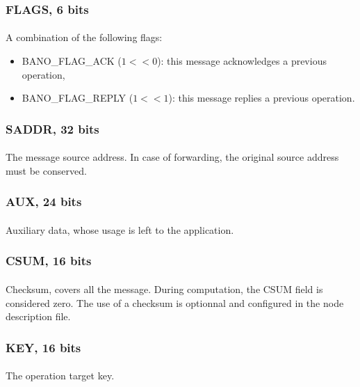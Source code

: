 \documentclass[a4paper, 11pt]{article}
\begin{document}
\subsubsection{FLAGS, 6 bits}
\paragraph{}
A combination of the following flags:
\begin{itemize}
\item BANO\_FLAG\_ACK ($1<<0$): this message acknowledges a previous
operation,
\item BANO\_FLAG\_REPLY ($1<<1$): this message replies a previous
operation.
\end{itemize}

\subsubsection{SADDR, 32 bits}
\paragraph{}
The message source address. In case of forwarding, the original source
address must be conserved.

\subsubsection{AUX, 24 bits}
\paragraph{}
Auxiliary data, whose usage is left to the application.

\subsubsection{CSUM, 16 bits}
\paragraph{}
Checksum, covers all the message. During computation, the CSUM field 
is considered zero. The use of a checksum is optionnal and configured
in the node description file.

\subsubsection{KEY, 16 bits}
\paragraph{}
The operation target key.
\end{document}
